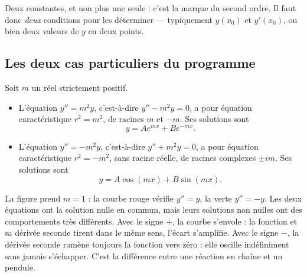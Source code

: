 \begin{remarque}
Deux constantes, et non plus une seule : c'est la marque du second ordre. Il
faut donc \emph{deux} conditions pour les déterminer — typiquement $y(x_{0})$
et $y'(x_{0})$, ou bien deux valeurs de $y$ en deux points.
\end{remarque}

\subsection{Les deux cas particuliers du programme}

\begin{propriete}[$y'' = m^{2}y$ et $y'' = -m^{2}y$]
Soit $m$ un réel strictement positif.
\begin{itemize}[leftmargin=1.4em, itemsep=0.25em]
  \item L'équation $y'' = m^{2}y$, c'est-à-dire $y''-m^{2}y = 0$, a pour
        équation caractéristique $r^{2} = m^{2}$, de racines $m$ et $-m$. Ses
        solutions sont
        \[ y = Ae^{mx} + Be^{-mx}. \]
  \item L'équation $y'' = -m^{2}y$, c'est-à-dire $y''+m^{2}y = 0$, a pour
        équation caractéristique $r^{2} = -m^{2}$, sans racine réelle, de
        racines complexes $\pm im$. Ses solutions sont
        \[ y = A\cos(mx) + B\sin(mx). \]
\end{itemize}
\end{propriete}

\begin{visualisation}
\begin{center}
\end{center}

La figure prend $m=1$ : la courbe rouge vérifie $y''=y$, la verte
$y''=-y$. Les deux équations ont la solution nulle en commun, mais leurs
solutions non nulles ont des comportements très différents. Avec le signe $+$, la courbe s'envole : la fonction
et sa dérivée seconde tirent dans le même sens, l'écart s'amplifie. Avec le
signe $-$, la dérivée seconde ramène toujours la fonction vers zéro : elle
oscille indéfiniment sans jamais s'échapper. C'est la différence entre une
réaction en chaîne et un pendule.
\end{visualisation}

